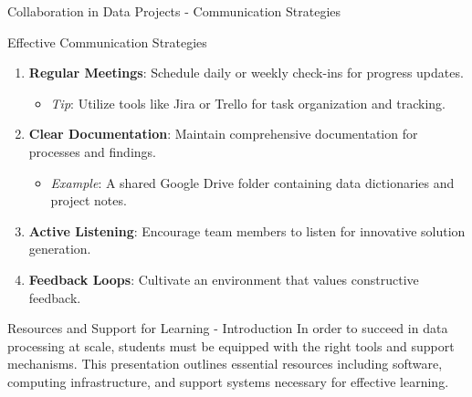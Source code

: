\documentclass[aspectratio=169]{beamer}
\begin{document}
\begin{frame}[fragile]{Collaboration in Data Projects - Communication Strategies}
    \begin{block}{Effective Communication Strategies}
        \begin{enumerate}
            \item \textbf{Regular Meetings}: Schedule daily or weekly check-ins for progress updates.
                \begin{itemize}
                    \item \textit{Tip}: Utilize tools like Jira or Trello for task organization and tracking.
                \end{itemize}
            \item \textbf{Clear Documentation}: Maintain comprehensive documentation for processes and findings.
                \begin{itemize}
                    \item \textit{Example}: A shared Google Drive folder containing data dictionaries and project notes.
                \end{itemize}
            \item \textbf{Active Listening}: Encourage team members to listen for innovative solution generation.
            \item \textbf{Feedback Loops}: Cultivate an environment that values constructive feedback.
        \end{enumerate}
    \end{block}
\end{frame}

\begin{frame}[fragile]{Resources and Support for Learning - Introduction}
    In order to succeed in data processing at scale, students must be equipped with the right tools and support mechanisms. This presentation outlines essential resources including software, computing infrastructure, and support systems necessary for effective learning.
\end{frame}
\end{document}
